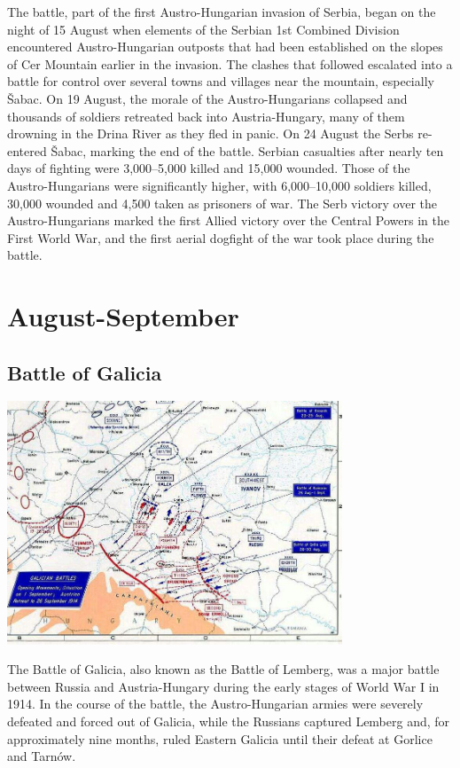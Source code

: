 \documentclass[11pt]{report}
\begin{document}
The battle, part of the first Austro-Hungarian invasion of Serbia, began on the night of 15 August when elements of the Serbian 1st Combined Division encountered Austro-Hungarian outposts that had been established on the slopes of Cer Mountain earlier in the invasion. The clashes that followed escalated into a battle for control over several towns and villages near the mountain, especially Šabac. On 19 August, the morale of the Austro-Hungarians collapsed and thousands of soldiers retreated back into Austria-Hungary, many of them drowning in the Drina River as they fled in panic. On 24 August the Serbs re-entered Šabac, marking the end of the battle. Serbian casualties after nearly ten days of fighting were 3,000–5,000 killed and 15,000 wounded. Those of the Austro-Hungarians were significantly higher, with 6,000–10,000 soldiers killed, 30,000 wounded and 4,500 taken as prisoners of war. The Serb victory over the Austro-Hungarians marked the first Allied victory over the Central Powers in the First World War, and the first aerial dogfight of the war took place during the battle.

\section{August-September}
\subsection{Battle of Galicia}
\vspace{2mm}\begin{center}\includegraphics[width=10cm]{./img/battleOfGalicia.jpg}\end{center}
The Battle of Galicia, also known as the Battle of Lemberg, was a major battle between Russia and Austria-Hungary during the early stages of World War I in 1914. In the course of the battle, the Austro-Hungarian armies were severely defeated and forced out of Galicia, while the Russians captured Lemberg and, for approximately nine months, ruled Eastern Galicia until their defeat at Gorlice and Tarnów.
\end{document}
